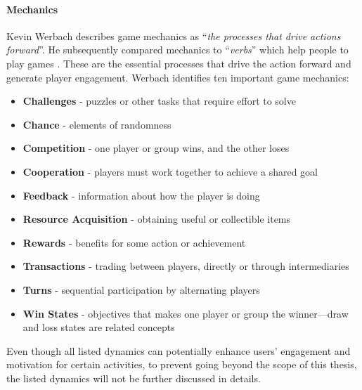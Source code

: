 \paragraph{Mechanics}
Kevin Werbach describes game mechanics as ``\textit{the processes that drive actions forward}''. He subsequently compared mechanics to ``\textit{verbs}'' which help people to play games \cite{werbach2012win}. These are the essential processes that drive the action forward and generate player engagement. Werbach identifies ten important game mechanics:
\begin{itemize}
\item \textbf{Challenges} - puzzles or other tasks that require effort to solve
\item \textbf{Chance} - elements of randomness
\item \textbf{Competition} - one player or group wins, and the other loses 
\item \textbf{Cooperation} - players must work together to achieve a shared goal
\item \textbf{Feedback} - information about how the player is doing
\item \textbf{Resource Acquisition} - obtaining useful or collectible items
\item \textbf{Rewards} - benefits for some action or achievement
\item \textbf{Transactions} - trading between players, directly or through intermediaries
\item \textbf{Turns} - sequential participation by alternating players
\item \textbf{Win States} - objectives that makes one player or group the winner—draw and loss states are
related concepts
\end{itemize}
Even though all listed dynamics can potentially enhance users' engagement and motivation for certain activities, to prevent going beyond the scope of this thesis, the listed dynamics will not be further discussed in details. 
